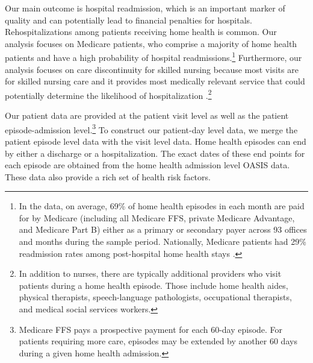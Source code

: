 \documentclass[final,12pt, notitlepage]{article}
\begin{document}
Our main outcome is hospital readmission, which is an important marker of quality and can potentially lead to financial penalties for hospitals. Rehospitalizations among patients receiving home health is common. Our analysis focuses on Medicare patients, who comprise a majority of home health patients and have a high probability of hospital readmissions.\footnote{In the data, on average, 69\% of home health episodes in each month are paid for by Medicare (including all Medicare FFS, private Medicare Advantage, and Medicare Part B) either as a primary or secondary payer across 93 offices and months during the sample period.
Nationally, Medicare patients had 29\% readmission rates among post-hospital home health stays \citep{MedPAC2014hh}.
}
Furthermore, our analysis focuses on care discontinuity for skilled nursing because most visits are for skilled nursing care and it provides most medically relevant service that could potentially determine the likelihood of hospitalization \citep{Russell2011}.\footnote{In addition to nurses, there are typically additional providers who visit patients during a home health episode. Those include home health aides, physical therapists, speech-language pathologists, occupational therapists, and medical social services workers.
}

Our patient data are provided at the patient visit level as well as the patient episode-admission level.\footnote{Medicare FFS pays a prospective payment for each 60-day episode. For patients requiring more care, episodes may be extended by another 60 days during a given home health admission.
}
To construct our patient-day level data, we merge the patient episode level data with the visit level data. Home health episodes can end by either a discharge or a hospitalization.
The exact dates of these end points for each episode are obtained from the home health admission level OASIS data. These data also provide a rich set of health risk factors.
\end{document}
